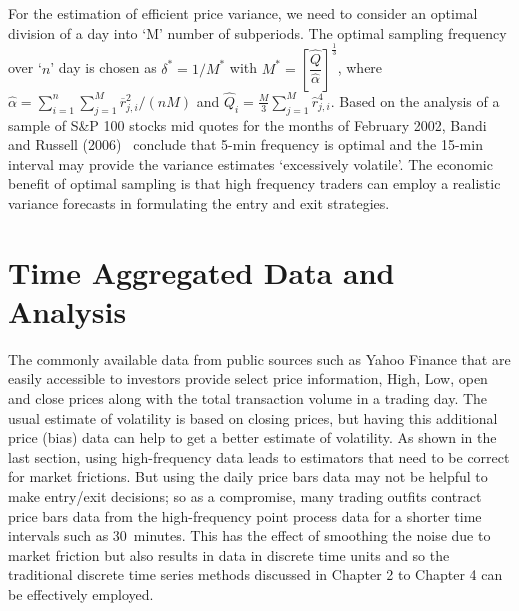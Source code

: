 For the estimation of efficient price variance, we need to consider an  optimal division of a day into `M' number of subperiods. The optimal sampling frequency over `$n$' day is chosen as $\delta^* = 1/M^*$ with $M^*= \left[\dfrac{\hat{Q}}{\hat{\alpha}}\right]^{\frac{1}{3}}$, where $\hat{\alpha} = \sum_{i=1}^n\sum_{j=1}^M\overline{r}_{j,i}^2/(nM)$ and $\hat{Q}_i = \frac{M}{3}\sum_{j=1}^M\hat{r}_{j,i}^4$. Based on the analysis of a sample of S\&P 100 stocks mid quotes for the months of February 2002, Bandi and Russell (2006)~\cite{bandi} conclude that 5-min frequency is optimal and the 15-min interval may provide the variance estimates `excessively volatile'. The economic benefit of optimal sampling is that high frequency traders can employ a realistic variance forecasts in formulating the entry and exit strategies. 




\section{Time Aggregated Data and Analysis}



The commonly available data from public sources such as Yahoo Finance that are easily accessible to investors provide select price information, High, Low, open and close prices along with the total transaction volume in a trading day. The usual estimate of volatility is based on closing prices, but having this additional price (bias) data can help to get a better estimate of volatility. As shown in the last section, using high-frequency data leads to estimators that need to be correct for market frictions. But using the daily price bars data may not be helpful to make entry/exit decisions; so as a compromise, many trading outfits contract price bars data from the high-frequency point process data for a shorter time intervals such as 30~minutes. This has the effect of smoothing the noise due to market friction but also results in data in discrete time units and so the traditional discrete time series methods discussed in Chapter 2 to Chapter 4 can be effectively employed. 


